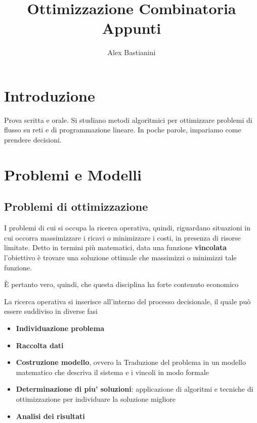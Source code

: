 \documentclass{report}
\title{\Huge{Ottimizzazione Combinatoria}\\Appunti}
\author{\huge{Alex Bastianini}}
\date{}
\begin{document}
\maketitle
\newpage%
\tableofcontents

\pagebreak

\chapter{Introduzione}
Prova scritta e orale. Si studiano metodi algoritmici per ottimizzare problemi di flusso su reti e di programmazione lineare. In poche parole, impariamo come prendere decisioni.

\chapter{Problemi e Modelli}

\section{Problemi di ottimizzazione}


I problemi di cui si occupa la ricerca operativa, quindi, riguardano situazioni in cui occorra massimizzare i ricavi o minimizzare i costi, in presenza di risorse limitate. Detto in termini più matematici, data una funzione \textbf{vincolata} l'obiettivo è trovare una soluzione ottimale che massimizzi o minimizzi tale funzione.

È pertanto vero, quindi, che questa disciplina ha forte contenuto economico

La ricerca operativa si inserisce all'interno del processo decisionale, il quale può essere suddiviso in diverse fasi
\begin{itemize}
\item \textbf{Individuazione problema}
  \item \textbf{Raccolta dati}
    \item \textbf{Costruzione modello}, ovvero la Traduzione del problema in un modello matematico che descriva il sistema e i vincoli in modo formale
      \item \textbf{Determinazione di piu' soluzioni}: applicazione di algoritmi e tecniche di ottimizzazione per individuare la soluzione migliore 
  \item \textbf{Analisi dei risultati}
\end{itemize}
\end{document}
